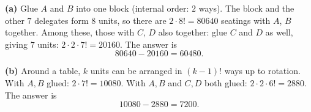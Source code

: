 \textbf{(a)} Glue $A$ and $B$ into one block (internal order: $2$ ways). The block and the other $7$ delegates form $8$ units, so there are $2\cdot8!=80640$ seatings with $A$, $B$ together. Among these, those with $C$, $D$ also together: glue $C$ and $D$ as well, giving $7$ units: $2\cdot2\cdot7!=20160$. The answer is
\[80640-20160=\boxed{60480}.\]

\textbf{(b)} Around a table, $k$ units can be arranged in $(k-1)!$ ways up to rotation. With $A,B$ glued: $2\cdot7!=10080$. With $A,B$ and $C,D$ both glued: $2\cdot2\cdot6!=2880$. The answer is
\[10080-2880=\boxed{7200}.\]
